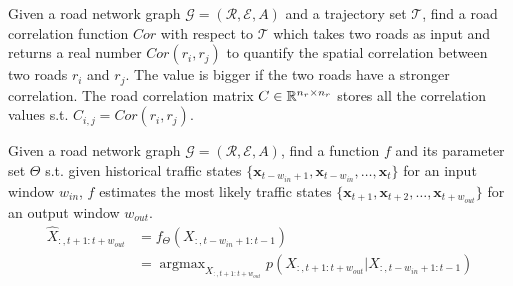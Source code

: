 \begin{problem}
    Given a road network graph $\mathcal{G}=(\mathcal{R}, \mathcal{E}, A)$ and a trajectory set $\mathcal T$, find a road correlation function $Cor$ with respect to $\mathcal{T}$ which takes two roads as input and returns a real number $Cor(r_i, r_j)$ to quantify the spatial correlation between two roads $r_i$ and $r_j$. The value is bigger if the two roads have a stronger correlation. The road correlation matrix $C\in\mathbb{R}^{n_r\times n_r}$ stores all the correlation values s.t. $C_{i, j}=Cor(r_i, r_j)$.
\end{problem}

\begin{problem}
    Given a road network graph $\mathcal{G}=(\mathcal{R}, \mathcal{E}, A)$, find a function $f$ and its parameter set $\Theta$ s.t. given historical traffic states $\{\mathbf{x}_{t-w_{in}+1}, \mathbf{x}_{t-w_{in}}, \dots, \mathbf{x}_t \}$ for an input window $w_{in}$, $f$ estimates the most likely traffic states $\{\mathbf{x}_{t+1}, \mathbf{x}_{t+2}, \dots, \mathbf{x}_{t+w_{out}} \}$ for an output window $w_{out}$.
    \begin{equation}
        \begin{aligned}
            \hat X_{:, t+1:t+w_{out}}&=f_\Theta(X_{:, t-w_{in}+1:t-1})\\&=\mathop{\arg\max}_{X_{:, t+1:t+w_{out}}} p(X_{:, t+1:t+w_{out}}|X_{:, t-w_{in}+1:t-1})
        \end{aligned}
    \end{equation}
\end{problem}
